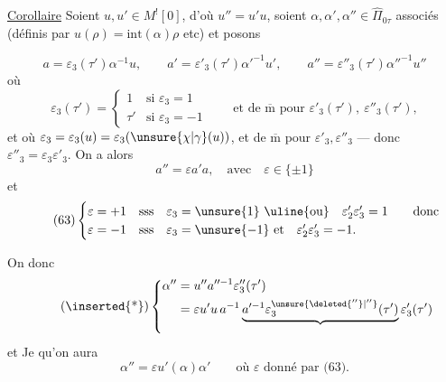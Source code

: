 \uline{Corollaire} Soient $u,u'\in M^![0]$, d'où $u''=u'u$, soient $\alpha,\alpha',\alpha''\in\widehat\Pi_{0\tau}$ associés (définis par $u(\rho)=\mathrm{int}(\alpha)\rho$ etc) et posons



\[
\tag{61}
a=\varepsilon_3(\tau')\alpha^{-1}u,\qquad
a'=\varepsilon'_3(\tau')\alpha'^{-1}u',\qquad
a''=\varepsilon''_3(\tau')\alpha''^{-1}u''
\]
où
\[
\varepsilon_3(\tau')=
\begin{cases}
1&\text{si }\varepsilon_3=1\\
\tau'&\text{si }\varepsilon_3=-1
\end{cases}
\qquad
\text{et de }\overline{\mathrm m}\text{ pour }\varepsilon'_3(\tau'),\ \varepsilon''_3(\tau'),
\]
et où $\varepsilon_3=\varepsilon_3(u)=\varepsilon_3(\unsure{\chi|\gamma}(u))$,
et de $\overline{\mathrm m}$ pour $\varepsilon'_3,\varepsilon''_3$
--- donc $\varepsilon''_3=\varepsilon_3\varepsilon'_3$. On a alors
\[
\tag{62}
a''=\varepsilon a'a,\quad\text{avec}\quad\varepsilon\in\{\pm1\}
\]
et
\[
\tag{63}
\begin{cases}
\varepsilon=+1&\text{sss}\quad \varepsilon_3=\unsure{1}\ \text{\uline{ou}}\quad
\varepsilon'_2\varepsilon'_3=1\qquad\text{donc}\\
\varepsilon=-1&\text{sss}\quad \varepsilon_3=\unsure{-1}\ \text{et}\quad
\varepsilon'_2\varepsilon'_3=-1.
\end{cases}
\]

On  donc
\[
\tag{\inserted{*}}
\left\{
\begin{aligned}
\alpha''&=u''a''^{-1}\varepsilon''_3(\tau')\\
&=\varepsilon u'u\,a^{-1}\underbrace{a'^{-1}\varepsilon_3^{\unsure{\deleted{''}|''}}(\tau')}_{\vphantom{A}}\varepsilon'_3(\tau')
\end{aligned}
\right.
\]
et Je 
 qu'on aura
\[
\tag{64}
\alpha''=\varepsilon u'(\alpha)\alpha'
\qquad\text{où }\varepsilon\text{ donné par (63).}
\]

